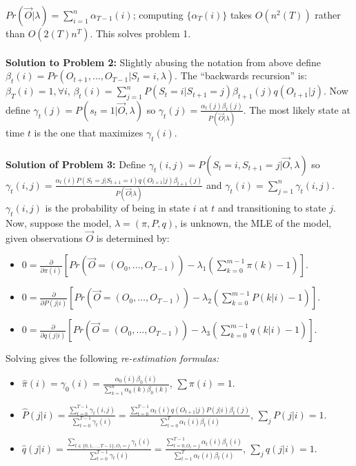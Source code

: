 $Pr({\vec O} | \lambda) = \sum_{i=1}^n \alpha_{T-1}(i)$;
computing $\{ \alpha_T(i) \}$ takes 
$O(n^2(T))$ rather than $O(2(T)n^{T})$.  This solves problem 1.
\\
\\
{\bf Solution to Problem 2:}
Slightly abusing the notation from above define
$\beta_t(i) = Pr(O_{t+1}, \ldots, O_{T-1} | S_t=i, \lambda)$.  The ``backwards
recursion'' is: $\beta_T(i)=1, \forall i$, 
$\beta_t(i)= \sum_{j=1}^n P(S_t=i|S_{t+1}=j) \beta_{t+1}(j)q(O_{t+1}|j)$.
Now define 
$\gamma_t(j)=P(s_t=1| {\vec O}, \lambda)$ so
$\gamma_t(j)= {\frac {\alpha_t(j) \beta_t(j)} {P({\vec O}| \lambda)}}$.  
The most likely state at time $t$ is the one that maximizes
$\gamma_t(i)$.
\\
\\
{\bf Solution of Problem 3:}
Define $\gamma_t(i,j)= P(S_t=i, S_{t+1}=j| {\vec O}, \lambda)$ so
$\gamma_t(i,j)= {\frac {\alpha_t(i) P(S_t=j | S_{t+1}=i) q(O_{t+1}|j) \beta_{t+1}(j)}
{P({\vec O} | \lambda)}}$ and $\gamma_t(i)= \sum_{j=1}^n \gamma_t(i,j)$.  $\gamma_t(i,j)$
is the probability of being in state $i$ at $t$ and transitioning to state $j$.
Now, suppose the model, $\lambda= (\pi, P, q)$, is unknown, the MLE of the
model, given observations ${\vec O}$ is determined by:
\begin {itemize}
\item
$0= {\frac {\partial} {\partial \pi(i)}}
[Pr({\vec O}=(O_0, \ldots, O_{T-1}))-\lambda_1(\sum_{k=0}^{m-1} \pi(k) -1)]$.
\item
$0= {\frac {\partial} {\partial P(j|i)}}
[Pr({\vec O}=(O_0, \ldots, O_{T-1}))-\lambda_2(\sum_{k=0}^{m-1} P(k|i)-1)]$.
\item
$0= {\frac {\partial} {\partial q(j|i)}}
[Pr( {\vec O}=(O_0, \ldots, O_{T-1}))-\lambda_3(\sum_{k=0}^{m-1} q(k|i)-1)]$.
\end {itemize}
Solving gives the following \emph{re-estimation formulas:}
\begin {itemize}
\item
${\hat {\pi}}(i) = \gamma_0(i)
= {\frac {\alpha_0(i) \beta_0(i)} {\sum_{k=1}^{n} \alpha_0(k) \beta_0(k)}}$,
$\sum \pi(i)=1$.
\item
${\hat {P}}(j|i)=
{\frac {\sum_{t=0}^{T-1} \gamma_t(i,j)} {\sum_{t=0}^{T-1} \gamma_t(i)}}=
{\frac {\sum_{t=0}^{T-1} \alpha_t(i) q(O_{t+1}|j) P(j|i) \beta_t(j)} 
{\sum_{t=0}^{T} \alpha_t(i) \beta_t(i)}}$,
$\sum_j P(j|i)=1$.
\item
${\hat {q}}(j|i)=
{\frac {\sum_{t \in \{0,1,\ldots, T-1 \}, O_t=j} \gamma_t(i)}
{\sum_{t=0}^{T-1} \gamma_t(i)}}=
{\frac {\sum_{t=0, O_t=j}^{T-1} \alpha_t(i) \beta_t(i)}
{\sum_{t=1}^{T} \alpha_t(i) \beta_t(i)}}$,
$\sum_j q(j|i)=1$.
\end {itemize}
